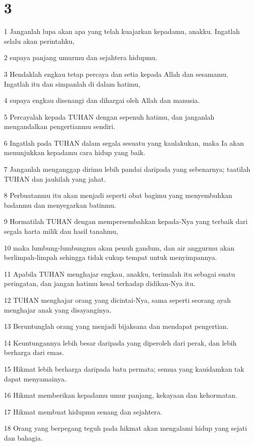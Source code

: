 \chapter{3}

\par 1 Janganlah lupa akan apa yang telah kuajarkan kepadamu, anakku. Ingatlah selalu akan perintahku,
\par 2 supaya panjang umurmu dan sejahtera hidupmu.
\par 3 Hendaklah engkau tetap percaya dan setia kepada Allah dan sesamamu. Ingatlah itu dan simpanlah di dalam hatimu,
\par 4 supaya engkau disenangi dan dihargai oleh Allah dan manusia.
\par 5 Percayalah kepada TUHAN dengan sepenuh hatimu, dan janganlah mengandalkan pengertianmu sendiri.
\par 6 Ingatlah pada TUHAN dalam segala sesuatu yang kaulakukan, maka Ia akan menunjukkan kepadamu cara hidup yang baik.
\par 7 Janganlah menganggap dirimu lebih pandai daripada yang sebenarnya; taatilah TUHAN dan jauhilah yang jahat.
\par 8 Perbuatanmu itu akan menjadi seperti obat bagimu yang menyembuhkan badanmu dan menyegarkan batinmu.
\par 9 Hormatilah TUHAN dengan mempersembahkan kepada-Nya yang terbaik dari segala harta milik dan hasil tanahmu,
\par 10 maka lumbung-lumbungmu akan penuh gandum, dan air anggurmu akan berlimpah-limpah sehingga tidak cukup tempat untuk menyimpannya.
\par 11 Apabila TUHAN menghajar engkau, anakku, terimalah itu sebagai suatu peringatan, dan jangan hatimu kesal terhadap didikan-Nya itu.
\par 12 TUHAN menghajar orang yang dicintai-Nya, sama seperti seorang ayah menghajar anak yang disayanginya.
\par 13 Beruntunglah orang yang menjadi bijaksana dan mendapat pengertian.
\par 14 Keuntungannya lebih besar daripada yang diperoleh dari perak, dan lebih berharga dari emas.
\par 15 Hikmat lebih berharga daripada batu permata; semua yang kauidamkan tak dapat menyamainya.
\par 16 Hikmat memberikan kepadamu umur panjang, kekayaan dan kehormatan.
\par 17 Hikmat membuat hidupmu senang dan sejahtera.
\par 18 Orang yang berpegang teguh pada hikmat akan mengalami hidup yang sejati dan bahagia.
